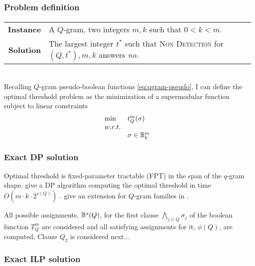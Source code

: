 \subsubsection{Problem definition}

\paragraph{}
\begin{tabular}{rl}
{\bf Instance}	&	A $Q$-gram, two integers $m,k$ such that $0 < k < m$.\\
{\bf Solution}	&	The largest integer $t^*$ such that \textsc{Non Detection} for $(Q,t^*),m,k$ answers \emph{no}.\\
\end{tabular}
\\

Recalling $Q$-gram pseudo-boolean functions \ref{eq:qgram-pseudo}, I can define the optimal threshold problem as the minimization of a supermodular function subject to linear constraints
\begin{equation}
\begin{array}{ll}
\text{min} & t_{Q}^{m} (\sigma)			\\
w.r.t.								\\
& \sigma \in \mathbb {B}^m_k				\\
\end{array}
\end{equation}

\subsubsection{Exact DP solution}

Optimal threshold is fixed-parameter tractable (FPT) in the span of the $q$-gram shape.
\citeauthor{Burkhardt2001} give a DP algorithm computing the optimal threshold in time $O(m \cdot k \cdot 2^{s(Q)})$ \citep{Burkhardt2001}.
\citeauthor{Kucherov2005} give an extension for $Q$-gram families in \citep{Kucherov2005}.

All possible assignments, \ie $\mathbb {B}^s(Q)$, for the first clause $\bigwedge_{j \in Q}{\sigma_j}$ of the boolean function $T_{Q}^{m}$ are considered and all satisfying assignments for it, \ie $\phi(Q)$, are computed.
Clause $Q_2$ is considered next...

\subsubsection{Exact ILP solution}

